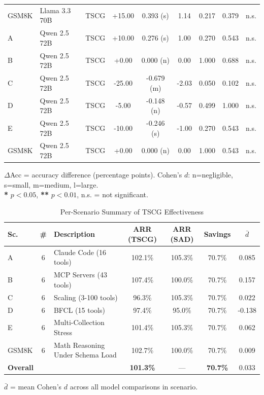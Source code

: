 \begin{table}[htbp]
\begin{tabular}{llccccccc}
    \addlinespace
    GSM8K & Llama 3.3 70B & TSCG & +15.00 & 0.393 (s) & 1.14 & 0.217 & 0.379 & n.s. \\
    \addlinespace
    A & Qwen 2.5 72B & TSCG & +10.00 & 0.276 (s) & 1.00 & 0.270 & 0.543 & n.s. \\
    \addlinespace
    B & Qwen 2.5 72B & TSCG & +0.00 & 0.000 (n) & 0.00 & 1.000 & 0.688 & n.s. \\
    \addlinespace
    C & Qwen 2.5 72B & TSCG & -25.00 & -0.679 (m) & -2.03 & 0.050 & 0.102 & n.s. \\
    \addlinespace
    D & Qwen 2.5 72B & TSCG & -5.00 & -0.148 (n) & -0.57 & 0.499 & 1.000 & n.s. \\
    \addlinespace
    E & Qwen 2.5 72B & TSCG & -10.00 & -0.246 (s) & -1.00 & 0.270 & 0.543 & n.s. \\
    \addlinespace
    GSM8K & Qwen 2.5 72B & TSCG & +0.00 & 0.000 (n) & 0.00 & 1.000 & 0.543 & n.s. \\
    \bottomrule
  \end{tabular}
  \vspace{2mm}
  \footnotesize{$\Delta$Acc = accuracy difference (percentage points). Cohen's $d$: n=negligible, s=small, m=medium, l=large.}
  \\
  \footnotesize{\textbf{*} $p < 0.05$, \textbf{**} $p < 0.01$, n.s. = not significant.}
\end{table}



\begin{table}[htbp]
  \centering
  \caption{Per-Scenario Summary of TSCG Effectiveness}
  \label{tab:scenario-summary}
  \begin{tabular}{lclcccc}
    \toprule
    Sc. & \# & Description & ARR (TSCG) & ARR (SAD) & Savings & $\bar{d}$ \\
    \midrule
    A & 6 & Claude Code (16 tools) & 102.1\% & 105.3\% & 70.7\% & 0.085 \\
    B & 6 & MCP Servers (43 tools) & 107.4\% & 100.0\% & 70.7\% & 0.157 \\
    C & 6 & Scaling (3-100 tools) & 96.3\% & 105.3\% & 70.7\% & 0.022 \\
    D & 6 & BFCL (15 tools) & 97.4\% & 95.0\% & 70.7\% & -0.138 \\
    E & 6 & Multi-Collection Stress & 101.4\% & 105.3\% & 70.7\% & 0.062 \\
    GSM8K & 6 & Math Reasoning Under Schema Load & 102.7\% & 100.0\% & 70.7\% & 0.009 \\
    \midrule
    \multicolumn{3}{l}{\textbf{Overall}} & \textbf{101.3\%} & --- & \textbf{70.7\%} & 0.033 \\
    \bottomrule
  \end{tabular}
  \vspace{2mm}
  \footnotesize{$\bar{d}$ = mean Cohen's $d$ across all model comparisons in scenario.}
\end{table}



